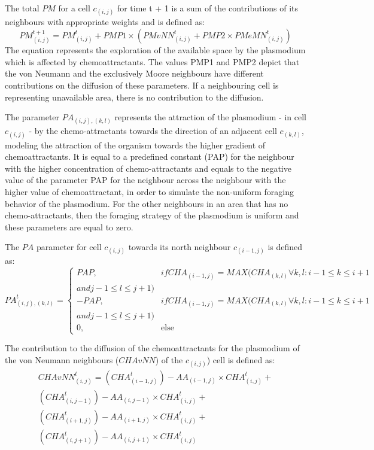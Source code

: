 The total $PM$ for a cell $c_{(i,j)}$ for time t + 1 is a sum of the contributions of its neighbours with appropriate weights and is defined as:
\begin{equation}
PM^{t+1}_{(i, j)} = PM^t_{(i, j)} + PMP1 \times (PMvNN^t_{(i, j)} + PMP2 \times PMeMN^t_{(i, j)})
\end{equation}
The equation represents the exploration of the available space by the plasmodium which is affected by chemoattractants. The values PMP1 and PMP2 depict that the von Neumann and the exclusively Moore neighbours have different contributions on the diffusion of these parameters. If a neighbouring cell is representing unavailable area, there is no contribution to the diffusion.
 
\par
The parameter $PA_{(i, j),(k,l)}$ represents the attraction of the plasmodium - in cell $c_{(i,j)}$ - by the chemo-attractants towards the direction of an adjacent cell $c_{(k,l)}$, modeling the attraction of the organism towards the higher gradient of chemoattractants. It is equal to a predefined constant (PAP) for the neighbour with the higher concentration of chemo-attractants and equals to the negative value of the parameter PAP for the neighbour across the neighbour with the higher value of chemoattractant, in order to simulate the non-uniform foraging behavior of the plasmodium. For the other neighbours in an area that has no chemo-attractants, then the foraging strategy of the plasmodium is uniform and these parameters are equal to zero.

\par
The $PA$ parameter for cell $c_{(i,j)}$ towards its north neighbour $c_{(i-1,j)}$ is defined as:
\begin{equation}
PA^t_{(i, j),(k,l)}=
\begin{cases} 
PAP, & if CHA_{(i-1, j)} = MAX(CHA_{(k, l)} \forall k, l: i - 1 \leq k \leq i + 1 \\and j - 1 \leq l \leq j+1) \\ 
- PAP, & if CHA_{(i-1, j)} = MAX(CHA_{(k, l)} \forall k, l: i - 1 \leq k \leq i + 1 \\and j - 1 \leq l \leq j+1) \\ 
0, & \mbox{else}
\end{cases}
\end{equation}

\par
The contribution to the diffusion of the chemoattractants for the plasmodium of the von Neumann neighbours ($CHAvNN$) of the $c_{(i,j)}$) cell is defined as:
\begin{equation}
\begin{split}
CHAvNN^t_{(i, j)} = 
(CHA^t_{(i-1, j)}) - AA_{(i-1, j)} \times CHA^t_{(i, j)} +
\\(CHA^t_{(i, j-1)}) - AA_{(i, j-1)} \times CHA^t_{(i, j)} +
\\(CHA^t_{(i+1, j)}) - AA_{(i+1, j)} \times CHA^t_{(i, j)}  +
\\(CHA^t_{(i, j+1)}) - AA_{(i, j+1)} \times CHA^t_{(i, j)}
\end{split}
\end{equation}

